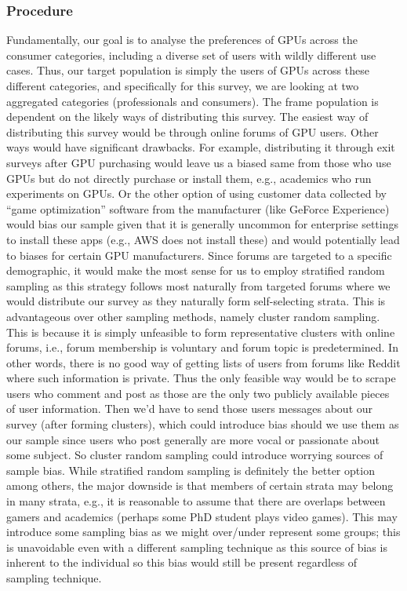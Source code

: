 \documentclass[
]{article}
\begin{document}
\hypertarget{procedure}{%
\subsubsection{Procedure}\label{procedure}}

Fundamentally, our goal is to analyse the preferences of GPUs across the
consumer categories, including a diverse set of users with wildly
different use cases. Thus, our target population is simply the users of
GPUs across these different categories, and specifically for this
survey, we are looking at two aggregated categories (professionals and
consumers). The frame population is dependent on the likely ways of
distributing this survey. The easiest way of distributing this survey
would be through online forums of GPU users. Other ways would have
significant drawbacks. For example, distributing it through exit surveys
after GPU purchasing would leave us a biased same from those who use
GPUs but do not directly purchase or install them, e.g., academics who
run experiments on GPUs. Or the other option of using customer data
collected by ``game optimization'' software from the manufacturer (like
GeForce Experience) would bias our sample given that it is generally
uncommon for enterprise settings to install these apps (e.g., AWS does
not install these) and would potentially lead to biases for certain GPU
manufacturers. Since forums are targeted to a specific demographic, it
would make the most sense for us to employ stratified random sampling as
this strategy follows most naturally from targeted forums where we would
distribute our survey as they naturally form self-selecting strata. This
is advantageous over other sampling methods, namely cluster random
sampling. This is because it is simply unfeasible to form representative
clusters with online forums, i.e., forum membership is voluntary and
forum topic is predetermined. In other words, there is no good way of
getting lists of users from forums like Reddit where such information is
private. Thus the only feasible way would be to scrape users who comment
and post as those are the only two publicly available pieces of user
information. Then we'd have to send those users messages about our
survey (after forming clusters), which could introduce bias should we
use them as our sample since users who post generally are more vocal or
passionate about some subject. So cluster random sampling could
introduce worrying sources of sample bias. While stratified random
sampling is definitely the better option among others, the major
downside is that members of certain strata may belong in many strata,
e.g., it is reasonable to assume that there are overlaps between gamers
and academics (perhaps some PhD student plays video games). This may
introduce some sampling bias as we might over/under represent some
groups; this is unavoidable even with a different sampling technique as
this source of bias is inherent to the individual so this bias would
still be present regardless of sampling technique.
\end{document}
